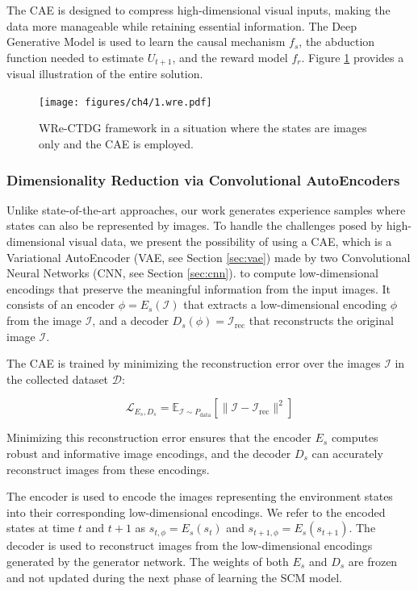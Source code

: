 The CAE is designed to compress high-dimensional visual inputs,
making the data more manageable while retaining essential information.
The Deep Generative Model is used to learn the causal mechanism \( f_s \),
the abduction function needed to estimate \( U_{t+1} \),
and the reward model \( f_r \).
Figure \ref{fig:wre} provides a visual illustration of the entire solution.

\begin{figure}[ht]
    \centering
    \texttt{[image: figures/ch4/1.wre.pdf]}
    \caption{WRe-CTDG framework in a situation where the states are
    images only and the CAE is employed.}
    \label{fig:wre}
\end{figure}

\subsubsection{Dimensionality Reduction via Convolutional AutoEncoders}

Unlike state-of-the-art approaches, our work generates experience samples
where states can also be represented by images. To handle the challenges posed
by high-dimensional visual data, we present the possibility of using a CAE,
which is a Variational AutoEncoder (VAE, see Section \ref{sec:vae})
made by two Convolutional Neural Networks (CNN, see Section \ref{sec:cnn}).
to compute low-dimensional encodings that preserve the meaningful
information from the input images.
It consists of an encoder \( \phi = E_s(\mathcal{I}) \)
that extracts a low-dimensional encoding \( \phi \)
from the image \( \mathcal{I} \), and a decoder
\( D_s(\phi) = \mathcal{I}_{\text{rec}} \)
that reconstructs the original image \( \mathcal{I} \).

The CAE is trained by minimizing the reconstruction error over
the images \( \mathcal{I} \) in the collected dataset \( \mathcal{D} \):

\begin{equation}
\mathcal{L}_{E_s, D_s} = \mathbb{E}_{\mathcal{I} \sim P_{\text{data}}}
\left[ \| \mathcal{I} - \mathcal{I}_{\text{rec}} \|^2 \right]
\end{equation}

Minimizing this reconstruction error ensures that the encoder \( E_s \)
computes robust and informative image encodings, and the decoder \( D_s \)
can accurately reconstruct images from these encodings.

The encoder is used to encode the images representing the environment
states into their corresponding low-dimensional encodings.
We refer to the encoded states at time \( t \) and \( t+1 \) as
\( s_{t,\phi} = E_s(s_t) \) and \( s_{t+1,\phi} = E_s(s_{t+1}) \).
The decoder is used to reconstruct images from the low-dimensional
encodings generated by the generator network. The weights of both
\( E_s \) and \( D_s \) are frozen and not updated during the next
phase of learning the SCM model.

